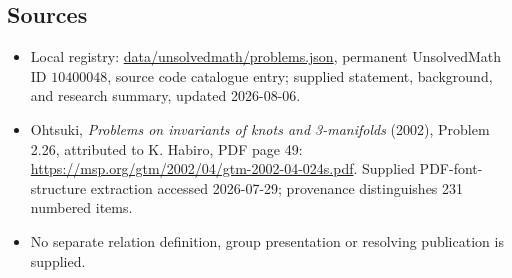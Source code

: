 \documentclass[11pt]{article}
\begin{document}
\subsection{Sources}
\begin{itemize}
\item Local registry: \url{data/unsolvedmath/problems.json}, permanent UnsolvedMath ID \(10400048\), source code catalogue entry; supplied statement, background, and research summary, updated 2026-08-06.
\item Ohtsuki, \emph{Problems on invariants of knots and 3-manifolds} (2002), Problem 2.26, attributed to K. Habiro, PDF page 49: \url{https://msp.org/gtm/2002/04/gtm-2002-04-024s.pdf}. Supplied PDF-font-structure extraction accessed 2026-07-29; provenance distinguishes 231 numbered items.
\item No separate relation definition, group presentation or resolving publication is supplied.
\end{itemize}
\end{document}
